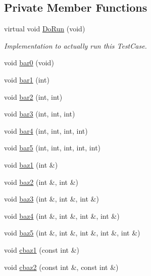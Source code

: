 \subsection*{Private Member Functions}
\begin{DoxyCompactItemize}
\item 
virtual void \hyperlink{classSimulatorTemplateTestCase_a31db3029349f8d2860e1d0e012fa11de}{Do\+Run} (void)
\begin{DoxyCompactList}\small\item\em Implementation to actually run this Test\+Case. \end{DoxyCompactList}\item 
void \hyperlink{classSimulatorTemplateTestCase_a7c53480e1b906bfeaea5e0070ff5cc0c}{bar0} (void)
\item 
void \hyperlink{classSimulatorTemplateTestCase_a83631fe15f6b4aaffcf702e71a664205}{bar1} (int)
\item 
void \hyperlink{classSimulatorTemplateTestCase_a0a416b76615bb0e90f1312694f09133b}{bar2} (int, int)
\item 
void \hyperlink{classSimulatorTemplateTestCase_aea52cc1b6dabac3782131bc96f7e3556}{bar3} (int, int, int)
\item 
void \hyperlink{classSimulatorTemplateTestCase_a0a46a38ced46c32a980d1458f23f26ac}{bar4} (int, int, int, int)
\item 
void \hyperlink{classSimulatorTemplateTestCase_a75066b2e82301377dddc07d887c96853}{bar5} (int, int, int, int, int)
\item 
void \hyperlink{classSimulatorTemplateTestCase_a1d732c063be0bf31734db30aca9bf826}{baz1} (int \&)
\item 
void \hyperlink{classSimulatorTemplateTestCase_acbbc7d0bab6bcc17f252bdfb47beb203}{baz2} (int \&, int \&)
\item 
void \hyperlink{classSimulatorTemplateTestCase_aeb4509497390b255767735f3280ae6ee}{baz3} (int \&, int \&, int \&)
\item 
void \hyperlink{classSimulatorTemplateTestCase_a505c79bbe80197a1cf9f3f23f221f27d}{baz4} (int \&, int \&, int \&, int \&)
\item 
void \hyperlink{classSimulatorTemplateTestCase_a76b308d5067d417af9bd36710dc53251}{baz5} (int \&, int \&, int \&, int \&, int \&)
\item 
void \hyperlink{classSimulatorTemplateTestCase_a893ae41537567fc7e95f011f370e74ba}{cbaz1} (const int \&)
\item 
void \hyperlink{classSimulatorTemplateTestCase_a0e58a1e62ebad4e4d0717cc64075c496}{cbaz2} (const int \&, const int \&)

\end{DoxyCompactItemize}
